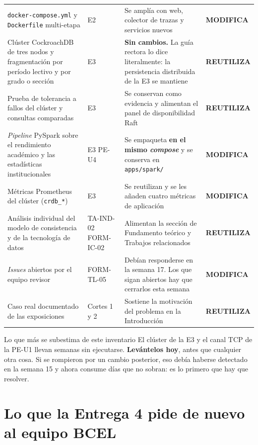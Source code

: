 \documentclass[11pt,a4paper]{article}
\newcommand{\reuso}{\cellcolor{filaReuso}\textbf{REUTILIZA}}
\newcommand{\cambia}{\cellcolor{filaCambia}\textbf{MODIFICA}}
\begin{document}
\begin{center}
\begin{longtable}{@{}p{3.7cm}p{1.5cm}p{5.2cm}p{4.4cm}@{}}
		\addlinespace
		\texttt{docker-compose.yml} y \texttt{Dockerfile} multi-etapa & E2 & Se amplía con web, colector de trazas y servicios nuevos & \cambia \\
		\addlinespace
		Clúster CockroachDB de tres nodos y fragmentación por período lectivo y por grado o sección & E3 & \textbf{Sin cambios.} La guía rectora lo dice literalmente: la persistencia distribuida de la E3 se mantiene & \reuso \\
		\addlinespace
		Prueba de tolerancia a fallos del clúster y consultas comparadas & E3 & Se conservan como evidencia y alimentan el panel de disponibilidad Raft & \reuso \\
		\addlinespace
		\emph{Pipeline} PySpark sobre el rendimiento académico y las estadísticas institucionales & E3 \newline PE-U4 & Se empaqueta \textbf{en el mismo \emph{compose}} y se conserva en \texttt{apps/spark/} & \cambia \\
		\addlinespace
		Métricas Prometheus del clúster (\texttt{crdb\_*}) & E3 & Se reutilizan y se les añaden cuatro métricas de aplicación & \cambia \\
		\addlinespace
		Análisis individual del modelo de consistencia y de la tecnología de datos & TA-IND-02 \newline FORM-IC-02 & Alimentan la sección de Fundamento teórico y Trabajos relacionados & \reuso \\
		\addlinespace
		\emph{Issues} abiertos por el equipo revisor & FORM-TL-05 & Debían responderse en la semana 17. Los que sigan abiertos hay que cerrarlos esta semana & \cambia \\
		\addlinespace
		Caso real documentado de las exposiciones & Cortes 1 y 2 & Sostiene la motivación del problema en la Introducción & \reuso \\
		\bottomrule
	\end{longtable}
\end{center}

\begin{avisoBox}{Lo que más se subestima de este inventario}
	El clúster de la E3 y el canal TCP de la PE-U1 llevan semanas sin ejecutarse. \textbf{Levántelos hoy}, antes que cualquier otra cosa. Si se rompieron por un cambio posterior, eso debía haberse detectado en la semana 15 y ahora consume días que no sobran: es lo primero que hay que resolver.
\end{avisoBox}

\section{Lo que la Entrega 4 pide de nuevo al equipo BCEL}
\end{document}
